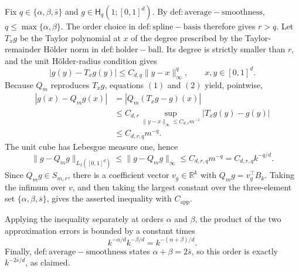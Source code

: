 Fix \(q\in\{\alpha,\beta,\bar s\}\) and \(g\in\mathsf H_q(1;[0,1]^d)\). By \(\mathrm{def:average-smoothness}\), \(q\le\max\{\alpha,\beta\}\). The order choice in \(\mathrm{def:spline-basis}\) therefore gives \(r>q\). Let \(T_xg\) be the Taylor polynomial at \(x\) of the degree prescribed by the Taylor-remainder Hölder norm in \(\mathrm{def:holder-ball}\). Its degree is strictly smaller than \(r\), and the unit Hölder-radius condition gives
\[
|g(y)-T_xg(y)|\le C_{d,q}\|y-x\|_\infty^q,\qquad x,y\in[0,1]^d.
\tag{2}
\]
Because \(Q_m\) reproduces \(T_xg\), equations \((1)\) and \((2)\) yield, pointwise,
\[
\begin{aligned}
|g(x)-Q_mg(x)|
&=|Q_m(T_xg-g)(x)|\\
&\le C_{d,r}\sup_{\|y-x\|_\infty\le C_{d,r}m^{-1}}|T_xg(y)-g(y)|\\
&\le C_{d,r,q}m^{-q}.
\end{aligned}
\]
The unit cube has Lebesgue measure one, hence
\[
\|g-Q_mg\|_{L_2([0,1]^d)}
\le \|g-Q_mg\|_\infty
\le C_{d,r,q}m^{-q}
=C_{d,r,q}k^{-q/d}.
\]
Since \(Q_mg\in S_{m,r}\), there is a coefficient vector \(v_g\in\mathbb R^k\) with \(Q_mg=v_g^\top B_k\). Taking the infimum over \(v\), and then taking the largest constant over the three-element set \(\{\alpha,\beta,\bar s\}\), gives the asserted inequality with \(C_{\mathrm{app}}\).

Applying the inequality separately at orders \(\alpha\) and \(\beta\), the product of the two approximation errors is bounded by a constant times
\[
k^{-\alpha/d}k^{-\beta/d}=k^{-(\alpha+\beta)/d}.
\]
Finally, \(\mathrm{def:average-smoothness}\) states \(\alpha+\beta=2\bar s\), so this order is exactly \(k^{-2\bar s/d}\), as claimed.